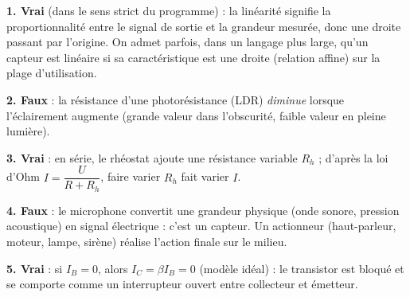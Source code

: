 \documentclass[11pt]{article}
\newcommand{\cle}[1]{{\popxbold\color{popdark}#1}}
\begin{document}
\begin{corrige}
\textbf{1. Vrai} (dans le sens strict du programme) : la linéarité signifie la proportionnalité entre le signal de sortie et la grandeur mesurée, donc une droite passant par l'origine. On admet parfois, dans un langage plus large, qu'un capteur est linéaire si sa caractéristique est une droite (relation affine) sur la plage d'utilisation.

\textbf{2. Faux} : la résistance d'une \cle{photorésistance (LDR)} \emph{diminue} lorsque l'éclairement augmente (grande valeur dans l'obscurité, faible valeur en pleine lumière).

\textbf{3. Vrai} : en série, le rhéostat ajoute une résistance variable $R_h$ ; d'après la loi d'Ohm $I = \dfrac{U}{R + R_h}$, faire varier $R_h$ fait varier $I$.

\textbf{4. Faux} : le microphone convertit une grandeur physique (onde sonore, pression acoustique) en signal électrique : c'est un \cle{capteur}. Un actionneur (haut-parleur, moteur, lampe, sirène) réalise l'action finale sur le milieu.

\textbf{5. Vrai} : si $I_B = 0$, alors $I_C = \beta I_B = 0$ (modèle idéal) : le transistor est bloqué et se comporte comme un interrupteur ouvert entre collecteur et émetteur.
\end{corrige}
\end{document}
